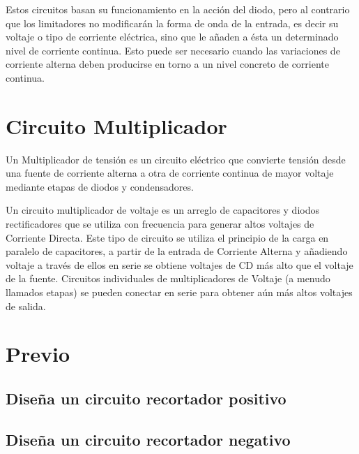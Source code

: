 \documentclass{mylib/reporteConCalif}
\begin{document}
Estos circuitos basan su funcionamiento en la acción del diodo, pero al contrario que los limitadores no modificarán la forma de onda de la entrada, es decir su voltaje o tipo de corriente eléctrica, sino que le añaden a ésta un determinado nivel de corriente continua. Esto puede ser necesario cuando las variaciones de corriente alterna deben producirse en torno a un nivel concreto de corriente continua.


\section{Circuito Multiplicador}

Un Multiplicador de tensión es un circuito eléctrico que convierte tensión desde una fuente de corriente alterna a otra de corriente continua de mayor voltaje mediante etapas de diodos y condensadores.


Un circuito multiplicador de voltaje es un arreglo de capacitores y diodos rectificadores que se utiliza con frecuencia para generar altos voltajes de Corriente Directa. Este tipo de circuito se utiliza el principio de la carga en paralelo de capacitores, a partir de la entrada de Corriente Alterna y añadiendo voltaje a través de ellos en serie se obtiene voltajes de CD más alto que el voltaje de la fuente. Circuitos individuales de multiplicadores de Voltaje (a menudo llamados etapas) se pueden conectar en serie para obtener aún más altos voltajes de salida.



\newpage
\section{Previo}

\subsection{Diseña un circuito recortador positivo}


\subsection{Diseña un circuito recortador negativo}

\end{document}
